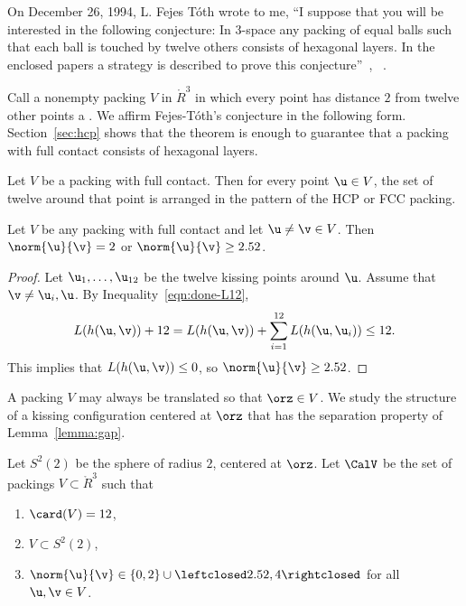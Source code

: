 On December 26, 1994, L. Fejes T\'oth wrote to me, ``I suppose that you will
be interested in the following conjecture: In $3$-space any packing of
equal balls such that each ball is touched by twelve others consists
of hexagonal layers.  In the enclosed papers a strategy is described
to prove this conjecture''~\cite{Fejes-Toth:89},
~\cite{Fejes-Toth:69}.

Call a nonempty packing $V$ in $\ring{R}^3$ in which every point has
distance $2$ from twelve other points a .  We affirm Fejes-T\'oth's conjecture
in the following form.  Section~\ref{sec:hcp} shows that the theorem
is enough to guarantee that a packing with full contact consists of
hexagonal layers.  
%
%


\begin{theorem}\label{thm:fc} 
  Let $V$ be a packing with full contact.  Then for every point $\u\in
  V$, the set of twelve around that point is arranged in the pattern
  of the HCP or FCC packing.
\end{theorem}
%
%
%



\begin{lemma}[] \label{lemma:gap}
  Let $V$ be any packing with full contact and let $\u\ne\v\in V$.
  Then $\norm{\u}{\v}=2$ or $\norm{\u}{\v} \ge 2.52$.
\end{lemma}
%
%

\begin{proof} Let $ \u_1,\ldots, \u_{12}$ be the twelve kissing points
  around $\u$.  Assume that $\v\ne \u_i,\u$.  By
  Inequality~\ref{eqn:done-L12},
\[
   L(h( \u, \v))  + 12 
  =  L(h( \u, \v)) + \sum_{i=1}^{12} L(h( \u, \u_i))  \le 12.
\]
This implies that $L(h( \u, \v))\le 0$, so $\norm{ \u}{ \v}\ge 2.52$.
\end{proof}

A packing $V$ may always be translated so that $\orz\in V$.  We study
the structure of a kissing configuration centered at $\orz$ that
has the separation property of Lemma~\ref{lemma:gap}.

\begin{definition}[$S^2(2)$,~$\CalV$]
  Let $S^2(2)$ be the sphere of radius $2$, centered at $\orz$.  Let
  $\CalV$ be the set of packings $V\subset \ring{R}^3$ such that
\begin{enumerate}\wasitemize 
\item $\card(V) = 12$,
\item $V\subset S^2(2)$,
\item $\norm{\u}{\v} \in \{0,2\}\cup
  \leftclosed2.52,4\rightclosed$ for all $\u,\v\in V$.
\end{enumerate}\wasitemize 
{}%
%
\end{definition}

